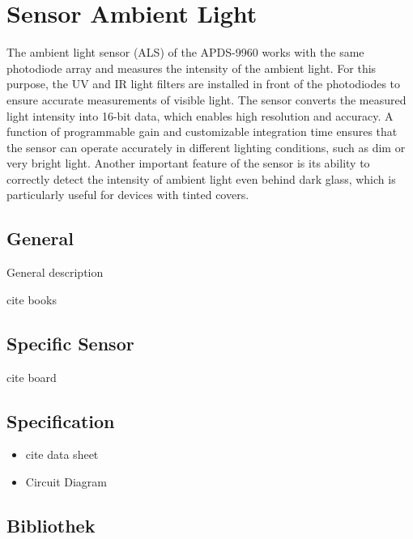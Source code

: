 %
%

\chapter{Sensor Ambient Light}

The ambient light sensor (ALS) of the APDS-9960 works with the same photodiode array and measures the intensity of the ambient light. For this purpose, the UV and IR light filters are installed in front of the photodiodes to ensure accurate measurements of visible light. The sensor converts the measured light intensity into 16-bit data, which enables high resolution and accuracy. A function of programmable gain and customizable integration time ensures that the sensor can operate accurately in different lighting conditions, such as dim or very bright light.
\medskip
Another important feature of the sensor is its ability to correctly detect the intensity of ambient light even behind dark glass, which is particularly useful for devices with tinted covers.
\smallskip
\cite{Avago:2015}


\section{General}

General description

cite books

\section{Specific Sensor}

cite board

\section{Specification}

\begin{itemize}
  \item cite data sheet
  \item Circuit Diagram
\end{itemize}

\section{Bibliothek}

